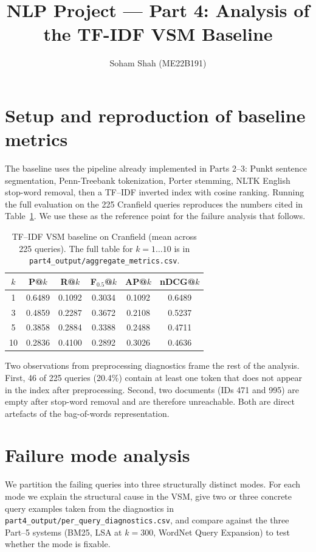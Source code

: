 \documentclass[11pt]{article}
\title{NLP Project --- Part 4: Analysis of the TF-IDF VSM Baseline}
\author{Soham Shah (ME22B191)}
\date{}
\begin{document}
\maketitle

\section{Setup and reproduction of baseline metrics}

The baseline uses the pipeline already implemented in Parts 2--3: Punkt
sentence segmentation, Penn-Treebank tokenization, Porter stemming, NLTK
English stop-word removal, then a TF--IDF inverted index with cosine ranking.
Running the full evaluation on the 225 Cranfield queries reproduces the
numbers cited in Table~\ref{tab:baseline}. We use these as the reference
point for the failure analysis that follows.

\begin{table}[h]
\centering
\small
\begin{tabular}{cccccc}
\toprule
$k$ & P@$k$ & R@$k$ & F$_{0.5}$@$k$ & AP@$k$ & nDCG@$k$ \\
\midrule
1  & 0.6489 & 0.1092 & 0.3034 & 0.1092 & 0.6489 \\
3  & 0.4859 & 0.2287 & 0.3672 & 0.2108 & 0.5237 \\
5  & 0.3858 & 0.2884 & 0.3388 & 0.2488 & 0.4711 \\
10 & 0.2836 & 0.4100 & 0.2892 & 0.3026 & 0.4636 \\
\bottomrule
\end{tabular}
\caption{TF--IDF VSM baseline on Cranfield (mean across 225 queries).
The full table for $k=1\ldots 10$ is in
\texttt{part4\_output/aggregate\_metrics.csv}.}
\label{tab:baseline}
\end{table}

Two observations from preprocessing diagnostics frame the rest of the
analysis. First, 46 of 225 queries (20.4\%) contain at least one token that
does not appear in the index after preprocessing. Second, two documents
(IDs 471 and 995) are empty after stop-word removal and are therefore
unreachable. Both are direct artefacts of the bag-of-words representation.

\section{Failure mode analysis}

We partition the failing queries into three structurally distinct modes.
For each mode we explain the structural cause in the VSM, give two or three
concrete query examples taken from the diagnostics in
\texttt{part4\_output/per\_query\_diagnostics.csv}, and compare against the
three Part--5 systems (BM25, LSA at $k=300$, WordNet Query Expansion) to
test whether the mode is fixable.
\end{document}
